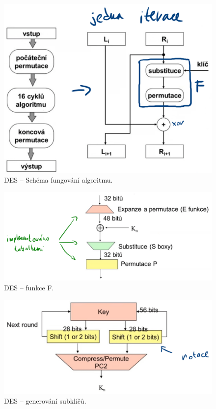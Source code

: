 \begin{figure}[H]
    \centering
    \includegraphics[width=0.75\linewidth]{des_schema.png}
    \caption{DES -- Schéma fungování algoritmu.}
\end{figure}

\begin{figure}[H]
    \centering
    \includegraphics[width=1\linewidth]{des_f.png}
    \caption{DES -- funkce F.}
\end{figure}

\begin{figure}[H]
    \centering
    \includegraphics[width=1\linewidth]{des_keys.png}
    \caption{DES -- generování subklíčů.}
\end{figure}

